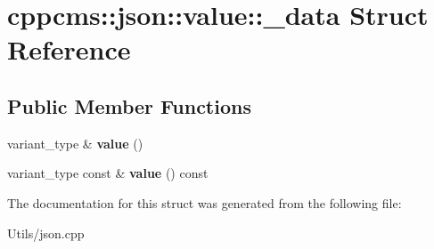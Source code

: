 \hypertarget{structcppcms_1_1json_1_1value_1_1__data}{\section{cppcms\-:\-:json\-:\-:value\-:\-:\-\_\-data Struct Reference}
\label{structcppcms_1_1json_1_1value_1_1__data}
}
\subsection*{Public Member Functions}
\begin{DoxyCompactItemize}
\item 
\hypertarget{structcppcms_1_1json_1_1value_1_1__data_ae3d93c8839b6e9cb8db240348122bd35}{variant\-\_\-type \& {\bfseries value} ()}\label{structcppcms_1_1json_1_1value_1_1__data_ae3d93c8839b6e9cb8db240348122bd35}

\item 
\hypertarget{structcppcms_1_1json_1_1value_1_1__data_a62f6aa2588f50d517c0f53af4cdc8f6c}{variant\-\_\-type const \& {\bfseries value} () const }\label{structcppcms_1_1json_1_1value_1_1__data_a62f6aa2588f50d517c0f53af4cdc8f6c}

\end{DoxyCompactItemize}


The documentation for this struct was generated from the following file\-:\begin{DoxyCompactItemize}
\item 
Utils/json.\-cpp\end{DoxyCompactItemize}
